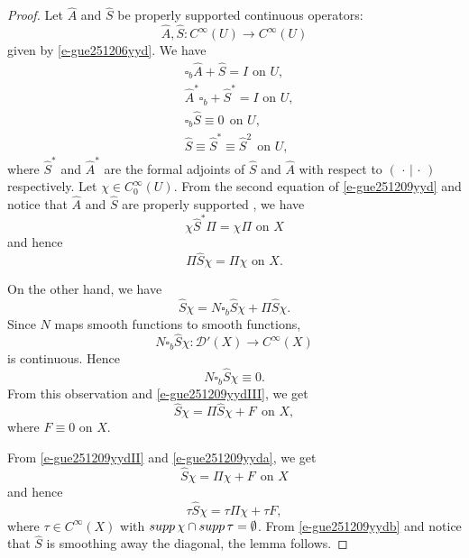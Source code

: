 \documentclass[10pt,a4paper]{amsart}
\newcommand{\To}{\rightarrow}
\newcommand{\mcd}{\mathcal D}
\begin{document}
\begin{proof}
Let $\hat A$ and $\hat S$ be properly supported continuous operators:
    \[\hat A, \hat S: C^\infty(U)\To C^\infty(U)\]
    given by \eqref{e-gue251206yyd}. We have
    \begin{equation}\label{e-gue251209yyd}
			\begin{split}
	&\mbox{$\square_b\hat{A}+\hat{S}=I$ on $U$},\\
    &\mbox{$\hat{A}^*\square_b+\hat{S}^*=I$ on $U$},\\
				&\square_b\hat{S}\equiv0\ \ \mbox{on $U$},\\
				&\hat{S}\equiv \hat{S}^*\equiv \hat{S}^2\ \ \mbox{on $U$},
			\end{split}
		\end{equation}
		where $\hat{S}^*$ and $\hat{A}^*$ are the formal adjoints of $\hat{S}$ and $\hat{A}$
		with respect to $(\,\cdot\,|\,\cdot\,)$ respectively.  
        Let $\chi\in C^\infty_0(U)$. 
From the second equation of \eqref{e-gue251209yyd} and notice that $\hat A$ and $\hat S$ are properly supported , we have 
\begin{equation}\label{e-gue251209yydI} \mbox{$\chi\hat{S}^*\Pi=\chi\Pi$ on $X$}
\end{equation}
and hence
\begin{equation}\label{e-gue251209yydII}
\mbox{$\Pi\hat{S}\chi=\Pi\chi$ on $X$}.\end{equation}

On the other hand, we have 
\begin{equation}\label{e-gue251209yydIII}\hat S\chi=N\square_b\hat S\chi+\Pi\hat S\chi.\end{equation}
Since $N$ maps smooth functions to smooth functions,
\[N\square_b\hat S\chi: \mcd'(X)\To C^\infty(X)\]
is continuous. Hence 
\[N\square_b\hat S\chi\equiv0.\]
From this observation and \eqref{e-gue251209yydIII}, we get 
\begin{equation}\label{e-gue251209yyda}\hat S\chi=\Pi\hat S\chi+F\ \ \mbox{on $X$},\end{equation}
where $F\equiv0$ on $X$. 

From \eqref{e-gue251209yydII} and \eqref{e-gue251209yyda}, we get 
\[\hat S\chi=\Pi\chi+F\ \ \mbox{on $X$}\]
and hence 
\begin{equation}\label{e-gue251209yydb}
\tau\hat S\chi=\tau\Pi\chi+\tau F,
\end{equation}
where $\tau\in C^\infty(X)$ with 
${\rm supp\,}\chi\cap{\rm supp\,}\tau=\emptyset$. From \eqref{e-gue251209yydb} and notice that $\hat S$ is smoothing away the diagonal, the lemma follows. 
\end{proof}
\end{document}
